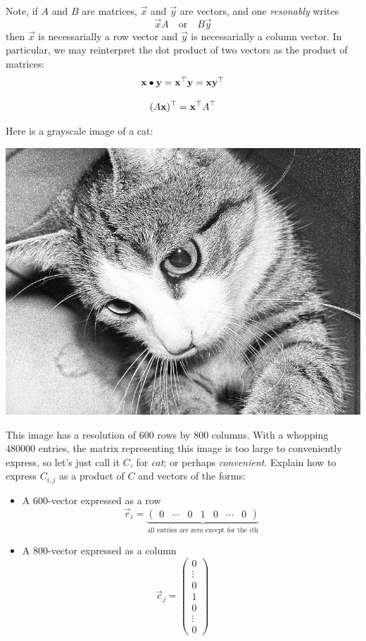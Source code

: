\documentclass{ximera}
\begin{document}
Note, if $A$ and $B$ are matrices, $\vec{x}$ and $\vec{y}$ are
vectors, and one \textit{resonably} writes
\[
\vec x A\quad\text{or}\quad  B \vec y
\]
then $\vec{x}$ is necessarially a row vector and $\vec{y}$ is necessarially a column vector. In particular, we may reinterpret the dot product of two vectors as the product of matrices:
\[
\mathbf{x}\bullet \mathbf{y} = \mathbf{x}^\top \mathbf{y} = \mathbf{x} \mathbf{y}^\top
\]


\begin{proposition}
  \[
  (A\mathbf{x})^\top = \mathbf{x}^\top A^\top
  \]
\end{proposition}

\begin{example}[Grayscale Image]%
  Here is a grayscale image of a cat:
  \begin{image}
  \includegraphics[width=.5\textwidth]{catface.jpg}
  \end{image}
  This image has a resolution of $600$ rows by $800$ columns. With a
  whopping $480000$ entries, the matrix representing this image is too
  large to conveniently express, so let's just call it $C$, for
  \textit{cat}; or perhaps \textit{convenient}.  Explain how to
  express $C_{i,j}$ as a product of $C$ and vectors of the forms:
  \begin{itemize}
    \item A $600$-vector expressed as a row
      \[
      \vec r_i = \underbrace{\begin{pmatrix} 0 & \cdots  & 0 & 1 & 0 & \cdots & 0 \end{pmatrix}}_{\text{all entries are zero except for the $i$th}}
      \]
    \item A $800$-vector expressed as a column
      \[
      \vec c_j=\begin{pmatrix} 0 \\ \vdots  \\ 0 \\ 1 \\ 0 \\ \vdots \\ 0 \end{pmatrix}\quad \begin{matrix}

\end{matrix}\]
\end{itemize}
\end{example}
\end{document}
